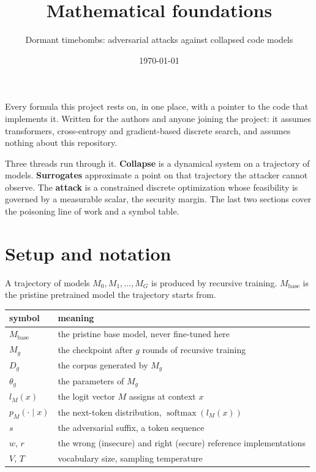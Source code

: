 \documentclass[11pt,a4paper]{article}
\title{Mathematical foundations}
\author{Dormant timebombs: adversarial attacks against collapsed code models}
\date{\today}
\newcommand{\softmax}{\operatorname{softmax}}
\begin{document}
\maketitle

Every formula this project rests on, in one place, with a pointer to the code that implements it.
Written for the authors and anyone joining the project: it assumes transformers, cross-entropy and
gradient-based discrete search, and assumes nothing about this repository.

Three threads run through it. \textbf{Collapse} is a dynamical system on a trajectory of models.
\textbf{Surrogates} approximate a point on that trajectory the attacker cannot observe. The
\textbf{attack} is a constrained discrete optimization whose feasibility is governed by a measurable
scalar, the security margin. The last two sections cover the poisoning line of work and a symbol
table.

\tableofcontents

\section{Setup and notation}

A trajectory of models $M_0, M_1, \dots, M_G$ is produced by recursive training. $M_{\mathrm{base}}$
is the pristine pretrained model the trajectory starts from.

\begin{center}
\begin{tabular}{ll}
\toprule
symbol & meaning \\
\midrule
$M_{\mathrm{base}}$ & the pristine base model, never fine-tuned here \\
$M_g$ & the checkpoint after $g$ rounds of recursive training \\
$D_g$ & the corpus generated by $M_g$ \\
$\theta_g$ & the parameters of $M_g$ \\
$l_M(x)$ & the logit vector $M$ assigns at context $x$ \\
$p_M(\cdot \mid x)$ & the next-token distribution, $\softmax(l_M(x))$ \\
$s$ & the adversarial suffix, a token sequence \\
$w$, $r$ & the wrong (insecure) and right (secure) reference implementations \\
$V$, $T$ & vocabulary size, sampling temperature \\
\bottomrule
\end{tabular}
\end{center}
\end{document}
